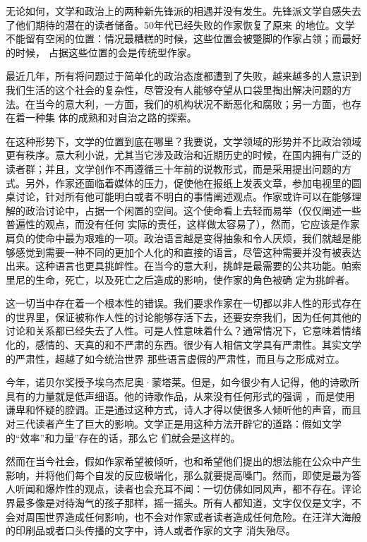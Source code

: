 \documentclass{article}
\begin{document}
无论如何，文学和政治上的两种新先锋派的相遇并没有发生。先锋派文学自感失去了他们期待的潜在的读者储备。50年代已经失败的作家恢复了原来
\newpage
的地位。文学不能留有空闲的位置：情况最糟糕的时候，这些位置会被蹩脚的作家占领；而最好的时候，
占据这些位置的会是传统型作家。 

最近几年，所有将问题过于简单化的政治态度都遭到了失败，越来越多的人意识到我们生活的这个社会的复杂性，尽管没有人能够夺望从口袋里掏出解决问题的方法。在当今的意大利，一方面，我们的机构状况不断恶化和腐败；另一方面，也存在着一种集
体的成熟和对自治之路的探索。 

在这种形势下，文学的位置到底在哪里？我要说，文学领域的形势并不比政治领域更有秩序。意大利小说，尤其当它涉及政治和近期历史的时候，在国内拥有广泛的读者群；并且，文学创作不再遵循三十年前的说教形式，而是采用提出问题的方式。另外，作家还面临着媒体的压力，促使他在报纸上发表文章，参加电视里的圆桌讨论，针对所有他可能明白或者不明白的事情阐述观点。作家或许可以在能够理解的政治讨论中，占据一个闲置的空间。这个使命看上去轻而易举（仅仅阐述一些普遍性的观点，而没有任何
\newpage
实际的责任，这样做太容易了），然而，它应该是作家肩负的使命中最为艰难的一项。政治语言越是变得抽象和令人厌烦，我们就越是能够感觉到需要一种不同的更加个人化的和直接的语言，尽管这种需要并没有被表达出来。这种语言也更具挑衅性。在当今的意大利，挑衅是最需要的公共功能。帕索里尼的生命，死亡，以及死亡之后造成的影响，使作家的角色被确
定为挑衅者。 

这一切当中存在着一个根本性的错误。我们要求作家在一切都以非人性的形式存在的世界里，保证被称作人性的讨论能够存活下去，还要安奈我们，因为任何其他的讨论和关系都已经失去了人性。可是人性意味着什么？通常情况下，它意味着情绪化的，感情的、天真的和不严肃的东西。很少有人相信文学具有严肃性。其实文学的严肃性，超越了如今统治世界
那些语言虚假的严肃性，而且与之形成对立。 

今年，诺贝尔奖授予埃乌杰尼奥·蒙塔莱。但是，如今很少有人记得，他的诗歌所具有的力量就是低声细语。他的诗歌作品，从来没有任何形式的强调
\newpage
，而是使用谦卑和怀疑的腔调。正是通过这种方式，诗人才得以使很多人倾听他的声音，而且对三代读者产生了巨大的影响。文学正是用这种方法开辟它的道路：假如文学的“效率”和力量”存在的话，那么它
们就会是这样的。 

然而在当今社会，假如作家希望被倾听，也和希望他们提出的想法能在公众中产生影响，并将他们每个自发的反应极端化，那么就要提高嗓门。然而，即使是最为答人听闻和爆炸性的观点，读者也会充耳不闻：一切仿佛如同风声，都不存在。评论界最多像是对待淘气的孩子那样，摇一摇头。所有人都知道，文字仅仅是文字，不会对周围世界造成任何影响，也不会对作家或者读者造成任何危险。在汪洋大海般的印刷品或者口头传播的文字中，诗人或者作家的文字
消失殆尽。 
\end{document}
